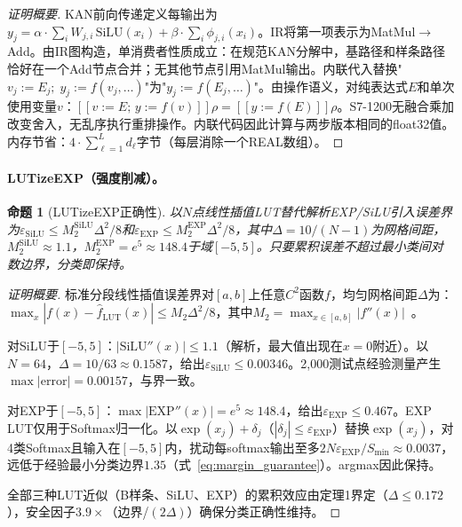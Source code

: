 \documentclass[journal,onecolumn]{IEEEtran}
\theoremstyle{definition}
\theoremstyle{plain}
\newtheorem{proposition}{命题}
\theoremstyle{remark}
\begin{document}
\begin{proof}[证明概要]
KAN前向传递定义每输出为$y_j = \alpha \cdot \sum_i W_{j,i}\,\text{SiLU}(x_i) + \beta \cdot \sum_i \phi_{j,i}(x_i)$。IR将第一项表示为MatMul$\rightarrow$Add。由IR图构造，单消费者性质成立：在规范KAN分解中，基路径和样条路径恰好在一个Add节点合并；无其他节点引用MatMul输出。内联代入替换"$v_j := E_j;\; y_j := f(v_j, \ldots)$"为"$y_j := f(E_j, \ldots)$"。由操作语义，对纯表达式$E$和单次使用变量$v$：$[\![v:=E;\, y:=f(v)]\!]\rho = [\![y:=f(E)]\!]\rho$。S7-1200无融合乘加改变舍入，无乱序执行重排操作。内联代码因此计算与两步版本相同的float32值。内存节省：$4 \cdot \sum_{\ell=1}^L d_\ell$字节（每层消除一个REAL数组）。
\end{proof}

\paragraph{LUTizeEXP（强度削减）。}

\begin{proposition}[LUTizeEXP正确性]
\label{prop:lutize_sound}
以$N$点线性插值LUT替代解析EXP/SiLU引入误差界为$\varepsilon_{\text{SiLU}} \leq M_2^{\text{SiLU}} \Delta^2/8$和$\varepsilon_{\text{EXP}} \leq M_2^{\text{EXP}} \Delta^2/8$，其中$\Delta = 10/(N-1)$为网格间距，$M_2^{\text{SiLU}} \approx 1.1$，$M_2^{\text{EXP}} = e^5 \approx 148.4$于域$[-5,5]$。只要累积误差不超过最小类间对数边界，分类即保持。
\end{proposition}

\begin{proof}[证明概要]
标准分段线性插值误差界对$[a,b]$上任意$C^2$函数$f$，均匀网格间距$\Delta$为：$\max_x |f(x) - \hat{f}_{\text{LUT}}(x)| \leq M_2 \Delta^2/8$，其中$M_2 = \max_{x\in[a,b]} |f''(x)|$~\cite{atkinson1989numerical}。

对SiLU于$[-5,5]$：$|\text{SiLU}''(x)| \leq 1.1$（解析，最大值出现在$x=0$附近）。以$N=64$，$\Delta = 10/63 \approx 0.1587$，给出$\varepsilon_{\text{SiLU}} \leq 0.00346$。2,000测试点经验测量产生$\max|\text{error}| = 0.00157$，与界一致。

对EXP于$[-5,5]$：$\max|\text{EXP}''(x)| = e^5 \approx 148.4$，给出$\varepsilon_{\text{EXP}} \leq 0.467$。EXP LUT仅用于Softmax归一化。以$\exp(x_j)+\delta_j$（$|\delta_j| \leq \varepsilon_{\text{EXP}}$）替换$\exp(x_j)$，对4类Softmax且输入在$[-5,5]$内，扰动每softmax输出至多$2N\varepsilon_{\text{EXP}}/S_{\min} \approx 0.0037$，远低于经验最小分类边界$1.35$（式~\ref{eq:margin_guarantee}）。argmax因此保持。

全部三种LUT近似（B样条、SiLU、EXP）的累积效应由定理1界定（$\Delta \leq 0.172$），安全因子$3.9\times$（边界/$(2\Delta)$）确保分类正确性维持。
\end{proof}
\end{document}
